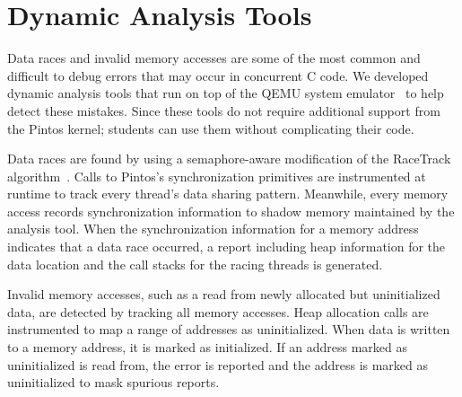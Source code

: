 \section{Dynamic Analysis Tools}

Data races and invalid memory accesses are some of the most common and
difficult to debug errors that may occur in concurrent C code.
We developed dynamic analysis tools that run on top of the QEMU
system emulator~\cite{Bellard2005QEMU} to help detect these mistakes. 
Since these tools do not require additional support from the Pintos kernel; 
students can use them without complicating their code.

Data races are found by using a semaphore-aware modification of the RaceTrack algorithm~\cite{Yu2005RaceTrack}. 
Calls to Pintos's synchronization primitives are instrumented at runtime to track every thread's data
sharing pattern.  Meanwhile, every memory access records synchronization information to shadow memory
maintained by the analysis tool. When the synchronization information for a memory address
indicates that a data race occurred, a report including heap information for the data location and the
call stacks for the racing threads is generated.

Invalid memory accesses, such as a read from newly allocated but uninitialized data, are detected by
tracking all memory accesses.  Heap allocation calls are instrumented to map a range of addresses as
uninitialized. When data is written to a memory address, it is marked as initialized. If an address
marked as uninitialized is read from, the error is reported and the address is marked as
uninitialized to mask spurious reports. 

